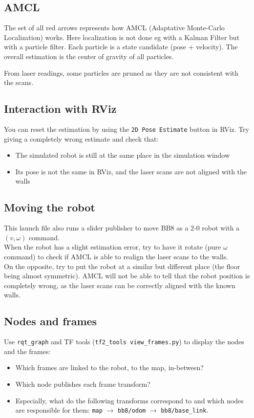 \documentclass{ecnreport}
\begin{document}
\subsection{AMCL}

The set of all red arrows represents how AMCL (Adaptative Monte-Carlo Localization) works. Here localization is not done eg with a Kalman Filter but with a particle filter. Each particle is a state candidate (pose + velocity). The overall estimation is the center of gravity of all particles.

From laser readings, some particles are pruned as they are not consistent with the scans.

\subsection{Interaction with RViz}

You can reset the estimation by using the \texttt{2D Pose Estimate} button in RViz. Try giving a completely wrong estimate and check that:
\begin{itemize}
 \item The simulated robot is still at the same place in the simulation window
 \item Its pose is not the same in RViz, and the laser scans are not aligned with the walls
\end{itemize}

\subsection{Moving the robot}

This launch file also runs a slider publisher to move BB8 as a 2-0 robot with a $(v,\omega)$ command.\\
When the robot has a slight estimation error, try to have it rotate (pure $\omega$ command) to check if AMCL is able to realign the laser scans to the walls. \\
On the opposite, try to put the robot at a similar but different place (the floor being almost symmetric).
AMCL will not be able to tell that the robot position is completely wrong, as the laser scans can be correctly aligned with the known walls.

\subsection{Nodes and frames}

Use \texttt{rqt\_graph} and TF tools (\texttt{tf2\_tools view\_frames.py}) to display the nodes and the frames:
\begin{itemize}
 \item Which frames are linked to the robot, to the map, in-between?
 \item Which node publishes each frame transform?
 \item Especially, what do the following transforms correspond to and which nodes are responsible for them:
 \texttt{map} $\rightarrow$ \texttt{bb8/odom} $\rightarrow$ \texttt{bb8/base\_link}.
\end{itemize}
\end{document}
